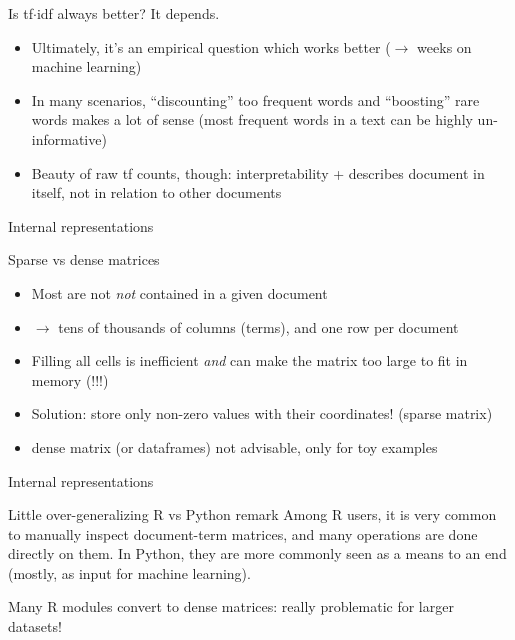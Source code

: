 \documentclass[compress]{beamer}
\begin{document}
\begin{frame}{Is tf$\cdot$idf always better?}
It depends.

\begin{itemize}
	\item Ultimately, it's an empirical question which works better ($\rightarrow$ weeks on machine learning)
	\item In many scenarios,  ``discounting'' too frequent words and ``boosting'' rare words makes a lot of sense (most frequent words in a text can be highly un-informative)
	\item Beauty of raw tf counts, though: interpretability + describes document in itself, not in relation to other documents
\end{itemize}
\end{frame}


\begin{frame}{Internal representations}
\begin{block}{Sparse vs dense matrices}
\begin{itemize}
	\item Most are not \emph{not} contained in a given document
	\item $\rightarrow$ tens of thousands of columns (terms), and one row per document
	\item Filling all cells is inefficient \emph{and} can make the matrix too large to fit in memory (!!!)
	\item Solution: store only non-zero values with their coordinates! (sparse matrix)
	\item dense matrix (or dataframes) not advisable, only for toy examples
\end{itemize}
\end{block}
\end{frame}



\begin{frame}{Internal representations}
	\begin{alertblock}{Little over-generalizing R vs Python remark}
		Among R users, it is very common to manually inspect document-term matrices, and many operations are done directly on them. In Python, they are more commonly seen as a means to an end (mostly, as input for machine learning). 
		
		Many R modules convert to dense matrices: really problematic for larger datasets!
	\end{alertblock}
	
\end{frame}
\end{document}
